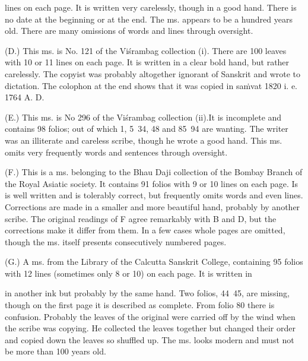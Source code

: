 \documentclass[11pt, openany]{book}
\begin{document}

\hangindent=1.5cm \indent \hspace{0.8cm} lines on each page. It is written very carelessly, though in a good hand. There is no date at the beginning or at the end. The ms. appears to be a hundred years old. There are many omissions of words and lines through oversight.

\hangindent=1.5cm (D.) This ms. is No. 121 of the Viśrambag collection (i). There are 100 leaves with 10 or 11 lines on each page. It is written in a clear bold hand, but rather carelessly. The copyist was probably altogether ignorant of Sanskrit and wrote to dictation. The colophon at the end shows that it was copied in saṁvat 1820 i. e. 1764 A. D.

\hangindent=1.5cm (E.) This ms. is No 296 of the Viśrambag collection (ii).It is incomplete and contains 98 folios; out of which 1, 5\textendash\ 34, 48 and 85\textendash\ 94 are wanting. The writer was an illiterate and careless scribe, though he wrote a good hand. This ms. omits very frequently words and sentences through oversight.

\hangindent=1.5cm (F.) This is a ms. belonging to the Bhau Daji collection of the Bombay Branch of the Royal Asiatic society. It contains 91 folios with 9 or 10 lines on each page. Is is well written and is tolerably correct, but frequently omits words and even lines. Corrections are made in a smaller and more beautiful hand, probably by another scribe. The original readings of F agree remarkably with B and D, but the corrections make it differ from them. In a few cases whole pages are omitted, though the ms. itself presents consecutively numbered pages.

\hangindent=1.5cm (G.) A ms. from the Library of the Calcutta Sanskrit College, containing 95 folios with 12 lines (sometimes only 8 or 10) on each page. It is written in

\newpage

\hangindent=1.5cm \indent \hspace{0.8cm} in another ink but probably by the same hand. Two folios, 44\textendash\ 45, are missing, though on the first page it is described as complete. From folio 80 there is confusion. Probably the leaves of the original were carried off by the wind when the scribe was copying. He collected the leaves together but changed their order and copied down the leaves so shuffled up. The ms. looks modern and must not be more than 100 years old.
\end{document}
